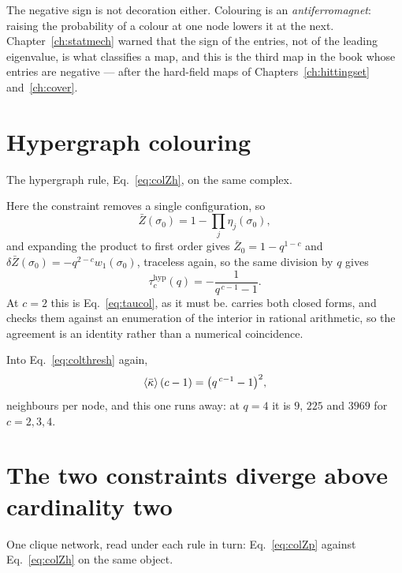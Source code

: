 The negative sign is not decoration either. Colouring is an
\emph{antiferromagnet}: raising the probability of a colour at one node lowers
it at the next. Chapter~\ref{ch:statmech} warned that the sign of the entries,
not of the leading eigenvalue, is what classifies a map, and this is the third
map in the book whose entries are negative --- after the hard-field maps of
Chapters~\ref{ch:hittingset} and~\ref{ch:cover}.

\section{Hypergraph colouring}
\label{sec:colouring-hyper}

The hypergraph rule, Eq.~\eqref{eq:colZh}, on the same complex.

Here the constraint removes a single configuration,
so
\[
  \bar{Z}(\sigma_{0})=1-\prod_{j}\eta_{j}(\sigma_{0}),
\]
and expanding the product to first order gives $\bar{Z}_{0}=1-q^{1-c}$ and
$\delta \bar{Z}(\sigma_{0})=-q^{2-c}w_{1}(\sigma_{0})$, traceless again, so the same
division by $q$ gives
\begin{equation}
  \tau^{\mathrm{hyp}}_{c}(q)=-\frac{1}{q^{\,c-1}-1}.
  \label{eq:tauhyp}
\end{equation}
At $c=2$ this is Eq.~\eqref{eq:taucol}, as it must be.  carries both closed forms, and checks them against an enumeration of the interior in rational arithmetic, so the agreement is an identity rather than a numerical coincidence.

Into Eq.~\eqref{eq:colthresh} again,
\begin{equation}
  \langle \bar\kappa \rangle\,(c-1)=\bigl(q^{\,c-1}-1\bigr)^{2},
  \label{eq:colhyperline}
\end{equation}
neighbours per node, and this one runs away: at $q=4$ it is $9$, $225$ and
$3969$ for $c=2,3,4$.

\section{The two constraints diverge above cardinality two}
\label{sec:twoconstraints-col}

One clique network, read under each rule in turn: Eq.~\eqref{eq:colZp} against
Eq.~\eqref{eq:colZh} on the same object.

